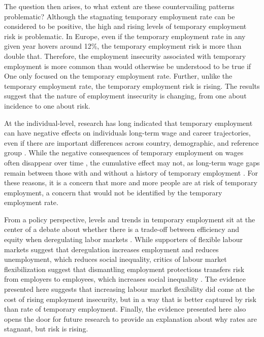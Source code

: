 \documentclass[12pt]{article}
\begin{document}
The question then arises, to what extent are these countervailing patterns problematic?  Although the stagnating temporary employment rate can be considered to be positive, the high and rising levels of temporary employment risk is problematic.  In Europe, even if the temporary employment rate in any given year hovers around 12\%, the temporary employment risk is more than double that.  Therefore, the employment insecurity associated with temporary employment is more common than would otherwise be understood to be true if One only focused on the temporary employment rate.  Further, unlike the temporary employment rate, the temporary employment risk is rising.  The results suggest that the nature of employment insecurity is changing, from one about incidence to one about risk.  

At the individual-level, research has long indicated that temporary employment can have negative effects on individuals long-term wage and career trajectories, even if there are important differences across country, demographic, and reference group \citep{gebel_2013}.  While the negative consequences of temporary employment on wages often disappear over time \citep{pavlopoulos_2013,de_lange_etal_2014}, the cumulative effect may not, as long-term wage gaps remain between those with and without a history of temporary employment \citep{fauser_2020}.  For these reasons, it is a concern that more and more people are at risk of temporary employment, a concern that would not be identified by the temporary employment rate.

From a policy perspective, levels and trends in temporary employment sit at the center of a debate about whether there is a trade-off between efficiency and equity when deregulating labor markets \citep{jahn_etal_2012}.  While supporters of flexible labour markets suggest that deregulation increases employment and reduces unemployment, which reduces social inequality, critics of labour market flexibilization suggest that dismantling employment protections transfers risk from employers to employees, which increases social inequality \citep{allmendinger_etal_2013}.  The evidence presented here suggests that increasing labour market flexibility did come at the cost of rising employment insecurity, but in a way that is better captured by risk than rate of temporary employment.  Finally, the evidence presented here also opens the door for future research to provide an explanation about why rates are stagnant, but risk is rising.  

\clearpage
\end{document}
